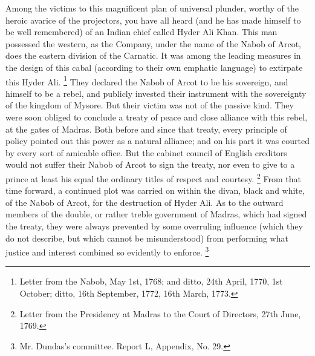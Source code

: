 Among the victims to this magnificent plan of universal plunder, worthy of the heroic avarice of the projectors, you have all heard (and he has made himself to be well remembered) of an Indian chief called Hyder Ali Khan. This man possessed the western, as the Company, under the name of the Nabob of Arcot, does the eastern division of the Carnatic. It was among the leading measures in the design of this cabal (according to their own emphatic language) to extirpate this Hyder Ali.
\footnote{ Letter from the Nabob, May 1st, 1768; and ditto, 24th April, 1770, 1st October; ditto, 16th September, 1772, 16th March, 1773.}
 They declared the Nabob of Arcot to be his sovereign, and himself to be a rebel, and publicly invested their instrument with the sovereignty of the kingdom of Mysore. But their victim was not of the passive kind. They were soon obliged to conclude a treaty of peace and close alliance with this rebel, at the gates of Madras. Both before and since that treaty, every principle of policy pointed out this power as a natural alliance; and on his part it was courted by every sort of amicable office. But the cabinet council of English creditors would not suffer their Nabob of Arcot to sign the treaty, nor even to give to a prince at least his equal the ordinary titles of respect and courtesy.
\footnote{ Letter from the Presidency at Madras to the Court of Directors, 27th June, 1769.}
 From that time forward, a continued plot was carried on within the divan, black and white, of the Nabob of Arcot, for the destruction of Hyder Ali. As to the outward members of the double, or rather treble government of Madras, which had signed the treaty, they were always prevented by some overruling influence (which they do not describe, but which cannot be misunderstood) from performing what justice and interest combined so evidently to enforce.
\footnote{ Mr. Dundas's committee. Report L, Appendix, No. 29.}


